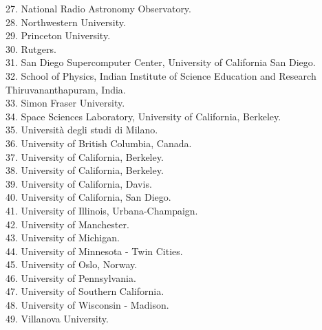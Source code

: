 \documentclass[PICOReport.tex]{subfiles}
\begin{document}
\begin{multicols}{2}
{27. National Radio Astronomy Observatory.  \\
28. Northwestern University.  \\
29. Princeton University.  \\
30. Rutgers.  \\
31. San Diego Supercomputer Center, University of California San Diego.  \\
32. School of Physics, Indian Institute of Science Education and Research Thiruvananthapuram,  India.  \\
33. Simon Fraser University.  \\
34. Space Sciences Laboratory, University of California, Berkeley.  \\
35. Universit\`a degli studi di Milano.  \\
36. University of British Columbia, Canada.  \\
37. University of California, Berkeley.  \\
38. University of California, Berkeley.  \\
39. University of California, Davis.  \\
40. University of California, San Diego.  \\
41. University of Illinois, Urbana-Champaign.  \\
42. University of Manchester.  \\
43. University of Michigan.  \\
44. University of Minnesota - Twin Cities.  \\
45. University of Oslo, Norway.  \\
46. University of Pennsylvania.  \\
47. University of Southern California.  \\
48. University of Wisconsin - Madison.  \\
49. Villanova University.  
}
\end{multicols}
\end{document}

